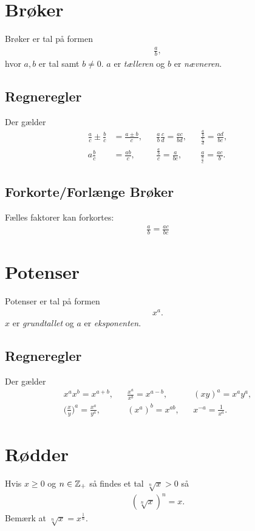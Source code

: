 \section{Brøker}
Brøker er tal på formen
\begin{align*}
\frac{a}{b},
\end{align*}
hvor $a,b$ er tal samt $b\neq 0$. $a$ er \emph{tælleren} og $b$ er \emph{nævneren}.
\subsection{Regneregler}
Der gælder
\begin{align*}
\frac{a}{c}\pm\frac{b}{c}&=\frac{a\pm b}{c},&&\frac{a}{b}\frac{c}{d}=\frac{ac}{bd},&&\frac{\frac{a}{b}}{\frac{c}{d}}=\frac{ad}{bc},\\
a\frac{b}{c}&=\frac{ab}{c},&&\frac{\frac{a}{b}}{c}=\frac{a}{bc},&&\frac{a}{\frac{b}{c}}=\frac{ac}{b}.
\end{align*}
\subsection{Forkorte/Forlænge Brøker}
Fælles faktorer kan forkortes:
\begin{align*}
\frac{a}{b}=\frac{ac}{bc}
\end{align*}

\section{Potenser}
Potenser er tal på formen
\begin{align*}
x^a.
\end{align*}
$x$ er \emph{grundtallet} og $a$ er \emph{eksponenten}.
\subsection{Regneregler}
Der gælder
\begin{align*}
x^ax^b=x^{a+b},&& \frac{x^a}{x^b}=x^{a-b},&&(xy)^a=x^ay^a,\\
\Big(\frac{x}{y}\Big)^a=\frac{x^a}{y^a},&&(x^a)^b=x^{ab},&& x^{-a}=\frac{1}{x^a}.
\end{align*}

\section{Rødder}
Hvis $x\geq 0$ og $n\in \mathbb{Z}_+$ så findes et tal $\sqrt[n]{x}>0$ så
\begin{align*}
(\sqrt[n]{x})^n=x.
\end{align*}
Bemærk at $\sqrt[n]{x}=x^{\frac{1}{n}}$.
